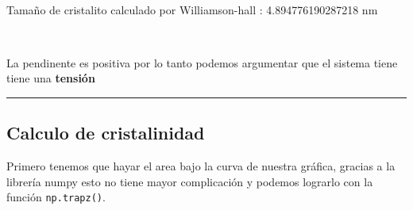 \documentclass[11pt]{article}
\begin{document}
    ~

Tamaño de cristalito calculado por Williamson-hall : 4.894776190287218
nm

~

    
    La pendinente es positiva por lo tanto podemos argumentar que el sistema
tiene tiene una \textbf{tensión}

    
    \begin{center}\rule{0.5\linewidth}{0.5pt}\end{center}

    \subsection{Calculo de cristalinidad}\label{calculo-de-cristalinidad}

Primero tenemos que hayar el area bajo la curva de nuestra gráfica,
gracias a la librería numpy esto no tiene mayor complicación y podemos
lograrlo con la función \texttt{np.trapz()}.
\end{document}

